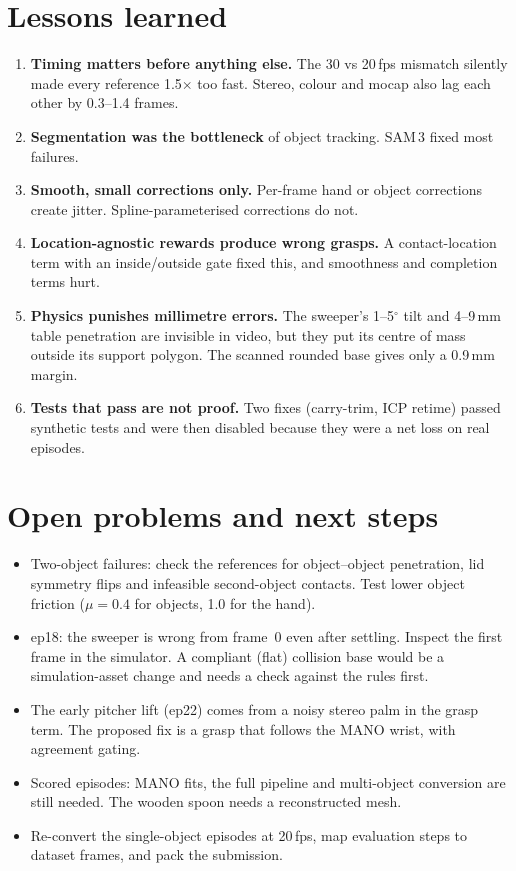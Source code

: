 \documentclass[10pt,a4paper]{article}
\begin{document}
\section{Lessons learned}
\begin{enumerate}
\item \textbf{Timing matters before anything else.} The 30 vs 20\,fps mismatch silently made every reference 1.5$\times$ too fast. Stereo, colour and mocap
also lag each other by 0.3--1.4 frames.
\item \textbf{Segmentation was the bottleneck} of object tracking. SAM\,3 fixed most failures.
\item \textbf{Smooth, small corrections only.} Per-frame hand or object corrections create jitter. Spline-parameterised corrections do not.
\item \textbf{Location-agnostic rewards produce wrong grasps.} A contact-location term with an inside/outside gate fixed this, and smoothness and completion terms hurt.
\item \textbf{Physics punishes millimetre errors.} The sweeper's 1--5$^\circ$ tilt and 4--9\,mm table penetration are invisible in video, but
they put its centre of mass outside its support polygon. The scanned rounded base gives only a 0.9\,mm margin.
\item \textbf{Tests that pass are not proof.} Two fixes (carry-trim, ICP retime) passed synthetic tests and were then disabled because they were a net loss on real episodes.
\end{enumerate}

\section{Open problems and next steps}
\begin{itemize}
\item Two-object failures: check the references for object--object penetration, lid symmetry flips and infeasible second-object contacts. Test
lower object friction ($\mu=0.4$ for objects, 1.0 for the hand).
\item ep18: the sweeper is wrong from frame~0 even after settling. Inspect the first frame in the simulator. A compliant (flat) collision base
would be a simulation-asset change and needs a check against the rules first.
\item The early pitcher lift (ep22) comes from a noisy stereo palm in the grasp term. The proposed fix is a grasp that follows the MANO wrist, with agreement gating.
\item Scored episodes: MANO fits, the full pipeline and multi-object conversion are still needed. The wooden spoon needs a reconstructed mesh.
\item Re-convert the single-object episodes at 20\,fps, map evaluation steps to dataset frames, and pack the submission.
\end{itemize}
\end{document}
